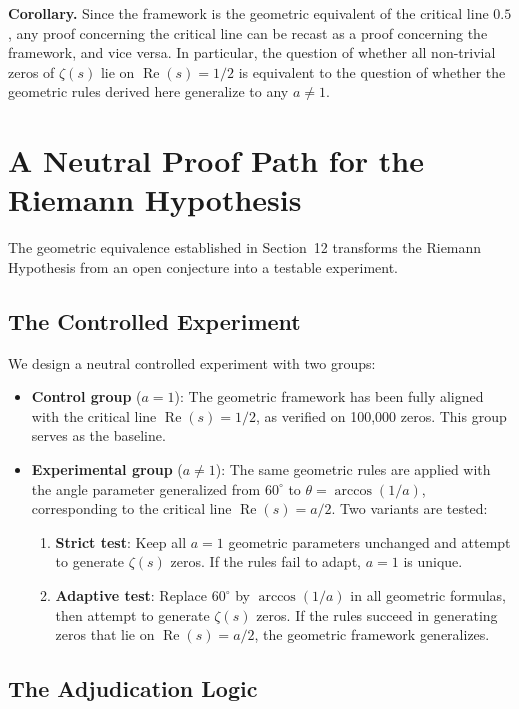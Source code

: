 \documentclass[12pt,a4paper]{article}
\begin{document}
\textbf{Corollary.} Since the framework is the geometric equivalent of the critical line $0.5$, any proof concerning the critical line can be recast as a proof concerning the framework, and vice versa. In particular, the question of whether all non-trivial zeros of $\zeta(s)$ lie on $\operatorname{Re}(s)=1/2$ is equivalent to the question of whether the geometric rules derived here generalize to any $a \neq 1$.

\section{A Neutral Proof Path for the Riemann Hypothesis}

The geometric equivalence established in Section~12 transforms the Riemann Hypothesis from an open conjecture into a testable experiment.

\subsection{The Controlled Experiment}

We design a neutral controlled experiment with two groups:

\begin{itemize}
\item \textbf{Control group} ($a=1$): The geometric framework has been fully aligned with the critical line $\operatorname{Re}(s)=1/2$, as verified on 100,000 zeros. This group serves as the baseline.
\item \textbf{Experimental group} ($a \neq 1$): The same geometric rules are applied with the angle parameter generalized from $60^\circ$ to $\theta = \arccos(1/a)$, corresponding to the critical line $\operatorname{Re}(s)=a/2$. Two variants are tested:
\begin{enumerate}
\item \textbf{Strict test}: Keep all $a=1$ geometric parameters unchanged and attempt to generate $\zeta(s)$ zeros. If the rules fail to adapt, $a=1$ is unique.
\item \textbf{Adaptive test}: Replace $60^\circ$ by $\arccos(1/a)$ in all geometric formulas, then attempt to generate $\zeta(s)$ zeros. If the rules succeed in generating zeros that lie on $\operatorname{Re}(s)=a/2$, the geometric framework generalizes.
\end{enumerate}
\end{itemize}

\subsection{The Adjudication Logic}
\end{document}
